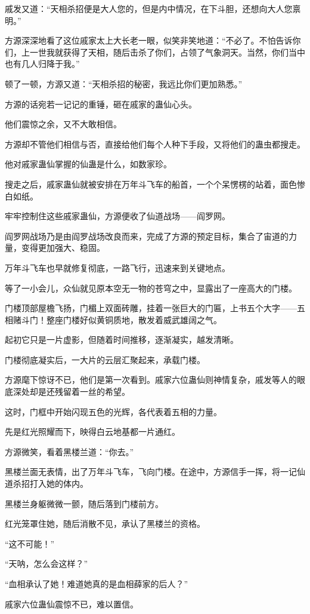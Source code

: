 \begin{this_body}
戚发又道：“天相杀招便是大人您的，但是内中情况，在下斗胆，还想向大人您禀明。”

方源深深地看了这位戚家太上大长老一眼，似笑非笑地道：“不必了。不怕告诉你们，上一世我就获得了天相，随后击杀了你们，占领了气象洞天。当然，你们当中也有几人归降于我。”

顿了一顿，方源又道：“天相杀招的秘密，我远比你们更加熟悉。”

方源的话宛若一记记的重锤，砸在戚家的蛊仙心头。

他们震惊之余，又不大敢相信。

方源却不管他们相信与否，直接给他们每个人种下手段，又将他们的蛊虫都搜走。

他对戚家蛊仙掌握的仙蛊是什么，如数家珍。

搜走之后，戚家蛊仙就被安排在万年斗飞车的船首，一个个呆愣楞的站着，面色惨白如纸。

牢牢控制住这些戚家蛊仙，方源便收了仙道战场——阎罗网。

阎罗网战场乃是由阎罗战场改良而来，完成了方源的预定目标，集合了宙道的力量，变得更加强大、稳固。

万年斗飞车也早就修复彻底，一路飞行，迅速来到关键地点。

等了一小会儿，众仙就见原本空无一物的苍穹之中，显露出了一座高大的门楼。

门楼顶部屋檐飞扬，门楣上双面砖雕，挂着一张巨大的门匾，上书五个大字——五相赌斗门！整座门楼好似黄铜质地，散发着威武雄阔之气。

起初它只是一片虚影，但随着时间推移，逐渐凝实，越发清晰。

门楼彻底凝实后，一大片的云层汇聚起来，承载门楼。

方源麾下惊讶不已，他们是第一次看到。戚家六位蛊仙则神情复杂，戚发等人的眼底深处却是还残留着一丝的希望。

这时，门框中开始闪现五色的光辉，各代表着五相的力量。

先是红光照耀而下，映得白云地基都一片通红。

方源微笑，看着黑楼兰道：“你去。”

黑楼兰面无表情，出了万年斗飞车，飞向门楼。在途中，方源信手一挥，将一记仙道杀招打入她的体内。

黑楼兰身躯微微一颤，随后落到门楼前方。

红光笼罩住她，随后消散不见，承认了黑楼兰的资格。

“这不可能！”

“天呐，怎么会这样？”

“血相承认了她！难道她真的是血相薛家的后人？”

戚家六位蛊仙震惊不已，难以置信。


\end{this_body}
